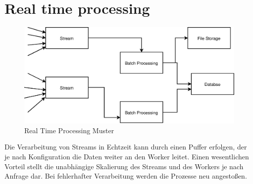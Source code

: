 \documentclass[
12pt,
english,
ngerman,
headsepline,
twoside,
openright,
numbers=noenddot,version=first
]{scrreprt}
\begin{document}
\section{Real time processing}
\begin{figure}[H]
	\centering
		\includegraphics[scale=0.60]{./pics/real-time-processing.eps}
	\caption{Real Time Processing Muster}
	\label{pic:real-time-processing}
\end{figure}
Die Verarbeitung von Streams in Echtzeit kann durch einen Puffer erfolgen, der je nach Konfiguration die Daten weiter an den Worker leitet. Einen wesentlichen Vorteil stellt die unabhängige Skalierung des Streams und des Workers je nach Anfrage dar. Bei fehlerhafter Verarbeitung werden die Prozesse neu angestoßen.
\end{document}
